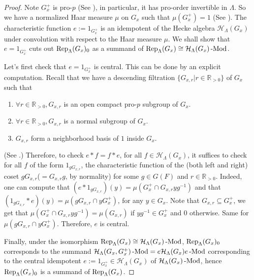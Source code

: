 	\begin{proof}
		Note $G_x^+$ is pro-$p$ (See \cite[II.5.2.(b)]{vigneras1996representations}), in particular, it has pro-order invertible in $\Lambda$. So we have a normalized Haar measure $\mu$ on $G_x$ such that $\mu(G_x^+)=1$ (See \cite[I.2.4]{vigneras1996representations}). The characteristic function $e:=1_{G_x^+}$ is an idempotent of the Hecke algebra $\mathcal{H}_{\Lambda}(G_x)$ under convolution with respect to the Haar measure $\mu$. We shall show that $e=1_{G_x^+}$ cuts out $\operatorname{\operatorname{Rep}}_{\Lambda}(G_x)_0$ as a summand of $\operatorname{\operatorname{Rep}}_{\Lambda}(G_x) \cong \mathcal{H}_{\Lambda}(G_x)\operatorname{-Mod}$.
		
		Let's first check that $e=1_{G_x^+}$ is central. This can be done by an explicit computation. Recall that we have a descending filtration $\{G_{x,r} | r\in \mathbb{R}_{>0}\}$ of $G_x$ such that 
		\begin{enumerate}
			\item $\forall r \in \mathbb{R}_{>0}, G_{x,r}$ is an open compact pro-$p$ subgroup of $G_x$.
			\item $\forall r \in \mathbb{R}_{>0}, G_{x,r}$ is a normal subgroup of $G_x$.
			\item $G_{x,r}$ form a neighborhood basis of $1$ inside $G_x$. 
		\end{enumerate}
		(See \cite[II.5.1]{vigneras1996representations}.) Therefore, to check $e \ast f=f \ast e$, for all $f \in \mathcal{H}_{\Lambda}(G_x)$, it suffices to check for all $f$ of the form $1_{gG_{x,r}}$, the characteristic function of the (both left and right) coset $gG_{x,r}$($=G_{x,r}g$, by normality) for some $g \in G(F)$ and $r \in \mathbb{R}_{>0}$. Indeed, one can compute that $(e \ast 1_{gG_{x,r}})(y)=\mu(G_x^+\cap G_{x,r}yg^{-1})$ and that $(1_{gG_{x,r}} \ast e)(y)=\mu(gG_{x,r}\cap yG_x^+)$, for any $y \in G_x$. Note that $G_{x,r} \subseteq G_x^+$, we get that $\mu(G_x^+\cap G_{x,r}yg^{-1})=\mu(G_{x,r})$ if $yg^{-1} \in G_x^+$ and $0$ otherwise. Same for $\mu(gG_{x,r}\cap yG_x^+)$. Therefore, $e$ is central.
		
		
		Finally, under the isomorphism $\operatorname{\operatorname{Rep}}_{\Lambda}(G_x) \cong \mathcal{H}_{\Lambda}(G_x)\operatorname{-Mod}$, $\operatorname{\operatorname{Rep}}_{\Lambda}(G_x)_0$ corresponds to the summand $\mathcal{H}_{\Lambda}(G_x, G_x^+)\operatorname{-Mod}=e\mathcal{H}_{\Lambda}(G_x)e\operatorname{-Mod}$ corresponding to the central idempotent $e:=1_{G_x^+} \in \mathcal{H}_{\Lambda}(G_x)$ of $\mathcal{H}_{\Lambda}(G_x)\operatorname{-Mod}$, hence $\operatorname{\operatorname{Rep}}_{\Lambda}(G_x)_0$ is a summand of $\operatorname{\operatorname{Rep}}_{\Lambda}(G_x)$. 
	\end{proof}
	
